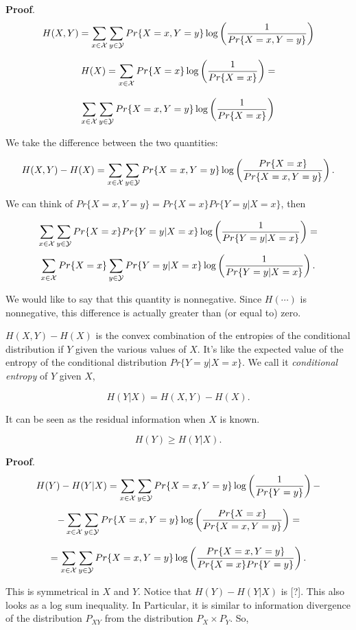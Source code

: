 \noindent\textbf{Proof}. 
\[ 
H(X, Y) = \sum_{x\in \mathcal{X}} \sum_{y \in \mathcal{Y}} Pr\{X=x, Y=y\}\log\left(\dfrac{1}{Pr\{X=x, Y=y\}}\right)\]

\[
 H(X) = \sum_{x\in \mathcal{X}}Pr\{X=x\}\log\left(\dfrac{1}{Pr\{X=x\}}\right) = 
\]

\[
 \sum_{x\in\mathcal{X}}\sum_{y\in\mathcal{Y}}Pr\{X=x, Y=y\}\log\left(\dfrac{1}{Pr\{X=x\}}\right)
\]

We take the difference between the two quantities:

\[
 H(X, Y) - H(X) =  \sum_{x\in\mathcal{X}}\sum_{y\in\mathcal{Y}}Pr\{X=x, Y=y\}\log\left(\dfrac{Pr\{X=x\}}{Pr\{X=x, Y=y\}}\right).
\]

We can think of $Pr\{X=x, Y=y\} = Pr\{X=x\}Pr\{Y=y | X=x\}$, then

\[
  \sum_{x\in \mathcal{X}} \sum_{y \in \mathcal{Y}} Pr\{X=x\}Pr\{Y=y | X=x\}\log\left(\dfrac{1}{Pr\{Y=y|X=x\}}\right) =
\]
\[
 \sum_{x\in \mathcal{X}}Pr\{X=x\}\sum_{y \in \mathcal{Y}} Pr\{Y=y | X=x\}\log\left(\dfrac{1}{Pr\{Y=y|X=x\}}\right).
\]

We would like to say that this quantity is nonnegative. Since $H(\cdots)$ is nonnegative, this difference is actually greater than (or equal to) zero.

$H(X, Y) - H(X)$ is the convex combination of the entropies of the conditional distribution if $Y$ given the various values of $X$. It's like the expected value of the entropy of the conditional distribution $Pr\{Y=y | X=x\}$. We call it \emph{conditional entropy} of $Y$ given $X$, 

$$H(Y|X) = H(X, Y) - H(X).$$

It can be seen as the residual information when $X$ is known.

\begin{prop}
 $$H(Y) \geq H(Y|X).$$
\end{prop}

\noindent\textbf{Proof}. 
\[
 H(Y) - H(Y|X) = \sum_{x \in \mathcal{X}} \sum_{y \in \mathcal{Y}}Pr\{X=x, Y=y\}\log\left(\dfrac{1}{Pr\{Y=y\}}\right) - \] 
 \[- \sum_{x \in \mathcal{X}}\sum_{y \in \mathcal{Y}} Pr\{X=x, Y=y\}\log\left(\dfrac{Pr\{X=x\}}{Pr\{X=x, Y=y\}}\right) =
\]

\[
 =  \sum_{x\in \mathcal{X}} \sum_{y \in \mathcal{Y}} Pr\{X=x, Y=y\}\log\left(\dfrac{Pr\{X=x, Y=y\}}{Pr\{X=x\}Pr\{Y=y\}}\right).
\]

This is symmetrical in $X$ and $Y$. Notice that $H(Y) - H(Y|X)$ is [?]. This also looks as a log sum inequality. In Particular, it is similar to information divergence of the distribution $P_{XY}$ from the distribution $P_X \times P_Y$. So,

